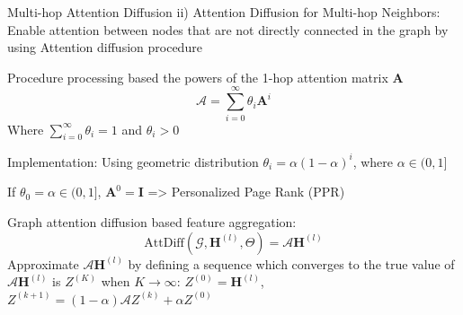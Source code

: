 \documentclass[notheorems, aspectratio=149]{beamer}
\begin{document}
		\begin{frame}{Multi-hop Attention Diffusion}
			ii) Attention Diffusion for Multi-hop Neighbors: Enable attention between nodes that are not directly connected in the graph by using Attention diffusion procedure
			
			 Procedure processing based the powers of the 1-hop attention matrix $\mathbf{A}$
			 \begin{equation}
			 	\mathcal{A} = \sum_{i = 0}^{\infty} \theta_i \mathbf{A}^{i}
			 \end{equation}
		 Where $\sum_{i=0}^{\infty}\theta_i = 1$ and $\theta_i > 0$
		 
		 Implementation: Using geometric distribution $\theta_i = \alpha(1-\alpha)^{i}$, where $\alpha \in (0, 1]$
		 
		 If $\theta_0 = \alpha \in (0, 1]$, $\mathbf{A}^0 = \mathbf{I}$ => Personalized Page Rank (PPR)
		 
		 Graph attention
diffusion based feature aggregation:
		 \begin{equation}
		 	\text{AttDiff}(\mathcal{G}, \mathbf{H}^{(l)}, \Theta) = \mathcal{A}\mathbf{H}^{(l)}
		 \end{equation}
	 	Approximate $\mathcal{A}\mathbf{H}^{(l)}$ by defining a sequence which converges to the true value of $\mathcal{A}\mathbf{H}^{(l)}$ is $Z^{(K)}$ when $K \rightarrow \infty$: $Z^{(0)} = \mathbf{H}^{(l)}$,  $Z^{(k+1)} = (1-\alpha)\mathcal{A}Z^{(k)} + \alpha Z^{(0)}$
		\end{frame}
\end{document}
